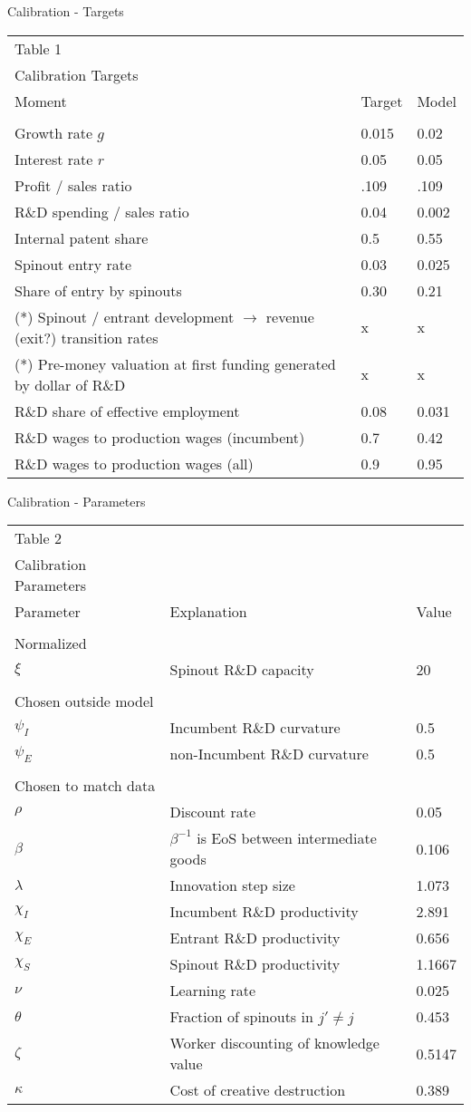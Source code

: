 \documentclass[english,usenames,dvipsnames]{beamer}
\begin{document}
\begin{frame}{Calibration - Targets}
\begin{table}[H]
	\scriptsize
	\centering{}%
	\begin{tabular}{lll}
		Table 1 &  &  \tabularnewline
		Calibration Targets &  &  \tabularnewline
		\hline 
		Moment  & Target & Model \tabularnewline
		&   & \tabularnewline
		\hline 
		Growth rate $g$ & 0.015 & 0.02 \tabularnewline
		Interest rate $r$ & 0.05 & 0.05 \tabularnewline
		Profit / sales ratio & .109 & .109 \tabularnewline
		R\&D spending / sales ratio & \alert{0.04} & \alert{0.002} \tabularnewline
		Internal patent share & 0.5 & 0.55 \tabularnewline
		Spinout entry rate & 0.03 & 0.025 \tabularnewline
		Share of entry by spinouts & 0.30 & 0.21 \tabularnewline
		(*) Spinout / entrant development $\rightarrow$ revenue (exit?) transition rates & x & x \tabularnewline
		(*) Pre-money valuation at first funding generated by dollar of R\&D & x & x \tabularnewline
		R\&D share of effective employment & \alert{0.08} & \alert{0.031} \tabularnewline
		R\&D wages to production wages (incumbent) & \alert{0.7} & \alert{0.42} \tabularnewline
		R\&D wages to production wages (all) & 0.9 & 0.95
	\end{tabular}
\end{table}
\end{frame}

\begin{frame}{Calibration - Parameters}
\begin{table}[h]
	\scriptsize
	\centering{}%
	\begin{tabular}{lll}
		Table 2 &  &  \tabularnewline
		Calibration Parameters &  &  \tabularnewline
		\hline 
		Parameter & Explanation & Value\tabularnewline
		\tabularnewline
		\hline 
		Normalized & & \tabularnewline
		$\xi$ & Spinout R\&D capacity & 20 \tabularnewline
		&  & \tabularnewline
		Chosen outside model & & \tabularnewline
		$\psi_I$ & Incumbent R\&D curvature & 0.5\tabularnewline
		$\psi_E$ & non-Incumbent R\&D curvature & 0.5\tabularnewline
		&  & \tabularnewline
		Chosen to match data & & \tabularnewline
		$\rho$ & Discount rate & 0.05\tabularnewline
		$\beta$ & $\beta^{-1}$ is EoS between intermediate goods & 0.106\tabularnewline
		$\lambda$ & Innovation step size & 1.073\tabularnewline
		$\chi_I$ & Incumbent R\&D productivity & 2.891\tabularnewline
		$\chi_E$ & Entrant R\&D productivity & 0.656\tabularnewline
		$\chi_S$ & Spinout R\&D productivity & 1.1667\tabularnewline
		$\nu$ & Learning rate & 0.025 \tabularnewline
		$\theta$ & Fraction of spinouts in $j' \ne j$ & 0.453 \tabularnewline
		$\zeta$ & Worker discounting of knowledge value & 0.5147 \tabularnewline
		$\kappa$ & Cost of creative destruction & 0.389
	\end{tabular}
\end{table}
\end{frame}
\end{document}
